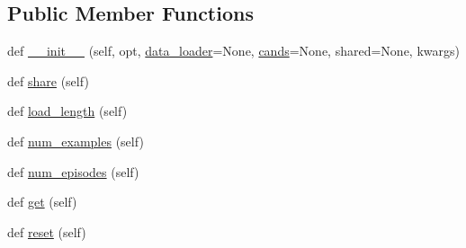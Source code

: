 \subsection*{Public Member Functions}
\begin{DoxyCompactItemize}
\item 
def \hyperlink{classparlai_1_1core_1_1teachers_1_1StreamDialogData_a72324ec2775d16b31d1d18287a8f84e9}{\+\_\+\+\_\+init\+\_\+\+\_\+} (self, opt, \hyperlink{classparlai_1_1core_1_1teachers_1_1StreamDialogData_a35ddb652bb3255dba53d5fd69046ebb7}{data\+\_\+loader}=None, \hyperlink{classparlai_1_1core_1_1teachers_1_1DialogData_a21822d2d86e26a27bdc8326b48ebc9b9}{cands}=None, shared=None, kwargs)
\item 
def \hyperlink{classparlai_1_1core_1_1teachers_1_1StreamDialogData_a6bb0ef8ed4a3360184f715e8fab9b3aa}{share} (self)
\item 
def \hyperlink{classparlai_1_1core_1_1teachers_1_1StreamDialogData_a5f3e6484038cefcc177a635148f0b492}{load\+\_\+length} (self)
\item 
def \hyperlink{classparlai_1_1core_1_1teachers_1_1StreamDialogData_ada385b7a8f549f4d65eb910b668c77e5}{num\+\_\+examples} (self)
\item 
def \hyperlink{classparlai_1_1core_1_1teachers_1_1StreamDialogData_a05f4816d029700a4bf9fd1eeafcb527c}{num\+\_\+episodes} (self)
\item 
def \hyperlink{classparlai_1_1core_1_1teachers_1_1StreamDialogData_a34ba92f60661471fee4eedb5ee2b9eda}{get} (self)
\item 
def \hyperlink{classparlai_1_1core_1_1teachers_1_1StreamDialogData_a6375bd13d685da4b3449caaafcc5ec13}{reset} (self)
\end{DoxyCompactItemize}
